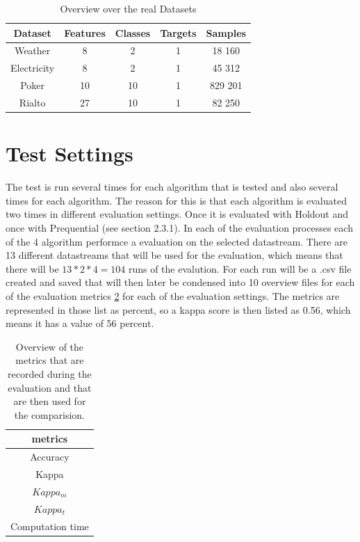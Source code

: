 \documentclass[12pt,oneside,a4paper,parskip]{scrbook}
\begin{document}
\begin{table}[H]
  \label{tab:realdata}
  \centering
  \begin{tabular} {|| c c c c c ||} 
    \hline
      Dataset & Features & Classes & Targets & Samples \\
    \hline\hline
      Weather & 8 & 2 & 1 & 18 160 \\
    \hline 
      Electricity & 8 & 2 & 1 & 45 312 \\
    \hline
      Poker & 10 & 10 & 1 & 829 201 \\
    \hline
      Rialto & 27 & 10 & 1 & 82 250 \\
    \hline
  \end{tabular} 
  \caption{Overview over the real Datasets}
\end{table}

\section{Test Settings}

The test is run several times for each algorithm that is tested and also several times for each algorithm.
The reason for this is that each algorithm is evaluated two times in different evaluation settings.
Once it is evaluated with Holdout and once with Prequential (see section 2.3.1).
In each of the evaluation processes each of the 4 algorithm performce a evaluation on the selected datastream.
There are 13 different datastreams that will be used for the evaluation, which means that there will be $13*2*4=104$ 
runs of the evalution.
For each run will be a .csv file created and saved that will then later be condensed into 10 overview files for each of the 
evaluation metrics \ref{tab:metrics} for each of the evaluation settings.
The metrics are represented in those list as percent, so a kappa score is then listed as 0.56, which means it has a value of 56 percent.

\begin{table}[H]
  \centering
    \begin{tabular} {|| c ||} 
      \hline
        metrics \\
      \hline\hline
        Accuracy  \\
      \hline 
        Kappa  \\
      \hline
        $Kappa_m$  \\
      \hline
        $Kappa_t$  \\
      \hline
        Computation time  \\
      \hline
    \end{tabular} 
  \caption{Overview of the metrics that are recorded during the evaluation and that are then used for the comparision.}
  \label{tab:metrics}
\end{table}
\end{document}
